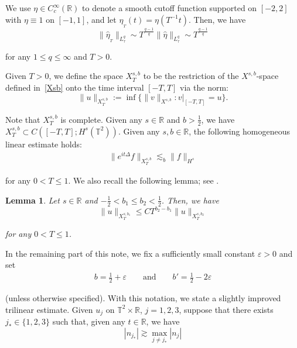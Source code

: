 \documentclass[%
11pt,  reqno]{amsart}
\newtheorem{lemma}[theorem]{Lemma}
\newcommand{\1}{\hspace{0.2mm}\text{I}\hspace{0.2mm}}
\newcommand{\noi}{\noindent}
\newcommand{\R}{\mathbb{R}}
\newcommand{\T}{\mathbb{T}}
\newcommand{\Dl}{\Delta}
\newcommand{\eps}{\varepsilon}
\newcommand{\ft}{\widehat}
\newcommand{\les}{\lesssim}
\newcommand{\ges}{\gtrsim}
\numberwithin{equation}{section}
\numberwithin{theorem}{section}
\begin{document}
We use $\eta \in C^\infty_c(\mathbb{R})$ to denote a smooth cutoff function supported on $[-2, 2]$ with $\eta \equiv 1$ on $[-1, 1]$,  and let $\eta_{_T}(t) =\eta(T^{-1}t)$.
Then, we have
\begin{equation}
 \|\ft \eta_{_{T}}\|_{L^q_\tau} \sim T^\frac{q-1}{q} \|\ft \eta\|_{L^q_\tau} 
\sim  T^\frac{q-1}{q}
\label{decay}
\end{equation} 

\noi
for any $1 \le q \le \infty$
and $T > 0$.


Given $T > 0$, we define the space $X_T^{s,b}$ to be the restriction of 
the $X^{s, b}$-space defined in~\eqref{Xsb} onto the time interval 
$[-T, T]$ via the norm:
\begin{equation}
\| u \|_{X_T^{s,b}} := \inf \big\{ \| v \|_{X^{s,b}}: v|_{[-T, T]} = u \big\}.
\label{Xsb2}
\end{equation}


\noi
Note that $X^{s, b}_T$ is complete.
Given any $s \in \R$ and $b > \frac 12$, we have $X_T^{s,b} \subset C([-T, T]; H^s(\T^2))$.
Given any $s, b \in \R$, 
the following homogeneous linear estimate holds:
\begin{align}
\| e^{it \Dl} f\|_{X^{s, b}_T}
\les_b \| f \|_{H^s}
\label{lin2}
\end{align}

\noi
for any $0 < T \le 1$.
We also recall the following lemma;
see \cite[Lemma 2.11]{TAO}.

\begin{lemma}
\label{LEM:decay1} Let $s \in\R$ and $- \frac 12 < b_1 \le b_2 < \frac 12$.
Then, we have 
\begin{equation*}
 \|u\|_{X^{s, b_1}_T}  \leq C T^{b_2 - b_1} \|u\|_{X^{s, b_2}_T}
\end{equation*}


\noi
for any $0 < T \le 1$. 

\end{lemma}





In the remaining part of this note, 
we fix a sufficiently small constant $\eps > 0$
and set 
\begin{align}
b = \frac 12 + \eps\qquad \text{and}\qquad 
b' = \frac 12 - 2\eps
\label{b1}
\end{align}

\noi
(unless otherwise specified).
With this notation, we state a slightly improved
trilinear estimate.
Given $u_j$ on $\T^2 \times \R$, $j = 1, 2, 3$, 
suppose that there exists $j_* \in \{1, 2, 3\}$ such that, 
given any $t \in \R$,  
we have 
\[ |n_{j_*}| \ges \max_{j \ne j_*}|n_j|\]
\end{document}
